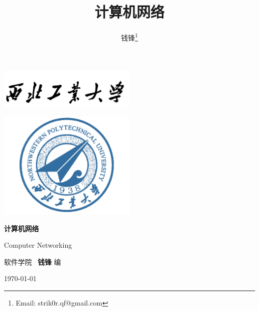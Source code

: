 \documentclass[10pt,UTF8]{book} %
\title{\textbf{计算机网络}}
\author{钱锋\thanks{Email: strik0r.qf@gmail.com}}
\begin{document}

\pagestyle{empty}
\begin{titlepage}
    \thispagestyle{empty}
    \centering
        \vspace*{2cm}
        \includegraphics[width=0.5\textwidth]{pic/npu_2.png}\par
        \vspace{1em}
        \includegraphics[width=0.5\textwidth]{pic/npu_1.png}\par
    \vspace{1cm}
        \begin{center}
            \Huge \heiti \textbf{计算机网络}

            Computer Networking
        \end{center}
        \vspace{15em}
        \begin{center}
        \songti
        \kaishu 软件学院 \, \heiti\textbf{钱锋} \quad \songti 编
        \vspace{0.5em}

    \today
    \end{center}
\end{titlepage}
\cleardoublepage
\maketitle
\cleardoublepage

\frontmatter
\newpage
\pagestyle{plain}
\makeatother

\pagestyle{plain}
{\tableofcontents}
\newpage
\thispagestyle{empty}
\cleardoublepage %


\makeatletter
\let\ps@plain\ps@empty
\makeatother
\end{document}
